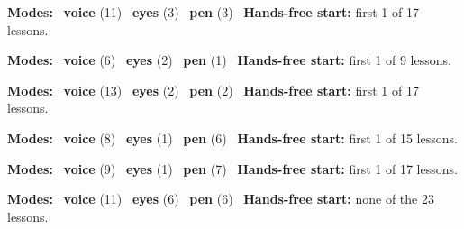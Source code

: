 \expandafter\def\csname hlchaptermodality13\endcsname{%
  {\small\noindent
    \textbf{Modes:} \hlvoicesign{}~\textbf{voice} (11) \quad \hlsightsign{}~\textbf{eyes} (3) \quad \hlpensign{}~\textbf{pen} (3)\quad
    \hlvoicesign{}~\textbf{Hands-free start:} first 1 of 17 lessons.%
    \par}\medskip
}

\expandafter\def\csname hlchaptermodality14\endcsname{%
  {\small\noindent
    \textbf{Modes:} \hlvoicesign{}~\textbf{voice} (6) \quad \hlsightsign{}~\textbf{eyes} (2) \quad \hlpensign{}~\textbf{pen} (1)\quad
    \hlvoicesign{}~\textbf{Hands-free start:} first 1 of 9 lessons.%
    \par}\medskip
}

\expandafter\def\csname hlchaptermodality15\endcsname{%
  {\small\noindent
    \textbf{Modes:} \hlvoicesign{}~\textbf{voice} (13) \quad \hlsightsign{}~\textbf{eyes} (2) \quad \hlpensign{}~\textbf{pen} (2)\quad
    \hlvoicesign{}~\textbf{Hands-free start:} first 1 of 17 lessons.%
    \par}\medskip
}

\expandafter\def\csname hlchaptermodality16\endcsname{%
  {\small\noindent
    \textbf{Modes:} \hlvoicesign{}~\textbf{voice} (8) \quad \hlsightsign{}~\textbf{eyes} (1) \quad \hlpensign{}~\textbf{pen} (6)\quad
    \hlvoicesign{}~\textbf{Hands-free start:} first 1 of 15 lessons.%
    \par}\medskip
}

\expandafter\def\csname hlchaptermodality17\endcsname{%
  {\small\noindent
    \textbf{Modes:} \hlvoicesign{}~\textbf{voice} (9) \quad \hlsightsign{}~\textbf{eyes} (1) \quad \hlpensign{}~\textbf{pen} (7)\quad
    \hlvoicesign{}~\textbf{Hands-free start:} first 1 of 17 lessons.%
    \par}\medskip
}

\expandafter\def\csname hlchaptermodality18\endcsname{%
  {\small\noindent
    \textbf{Modes:} \hlvoicesign{}~\textbf{voice} (11) \quad \hlsightsign{}~\textbf{eyes} (6) \quad \hlpensign{}~\textbf{pen} (6)\quad
    \hlvoicesign{}~\textbf{Hands-free start:} none of the 23 lessons.%
    \par}\medskip
}
